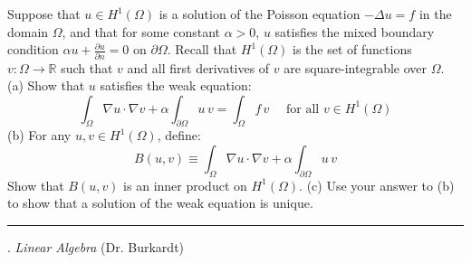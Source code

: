 \documentclass [11point]{article}
\def \rn { {\rm I} \!\! \! {\rm R}^n }
\begin{document}
Suppose that $u \in H^1(\Omega)$ is a solution of the Poisson equation $- \Delta u = f$ in the domain $\Omega$, and that for some constant $\alpha > 0$, $u$ satisfies the mixed boundary condition 
$\alpha u + \frac{\partial u}{\partial n} = 0$ on $\partial \Omega$.
\vskip 0.1in
Recall that $H^1(\Omega)$ is the set of functions $v : \Omega \rightarrow \mathbb{R}$ such that
$v$ and all first derivatives of $v$ are square-integrable over $\Omega$.
\vskip 0.1in
(a) Show that $u$ satisfies the weak equation:
\begin{displaymath}
  \int_{\Omega} \nabla u \cdot \nabla v + \alpha \int_{\partial \Omega} u \, v = \int_{\Omega} f \, v \quad {\textrm{ for all }} v\in H^1(\Omega)
\end{displaymath}
\vskip 0.1in
(b) For any $u, v \in H^1(\Omega)$, define:
\begin{displaymath}
  B(u,v) \equiv \int_{\Omega} \nabla u \cdot \nabla v + \alpha \int_{\partial \Omega} u \, v
\end{displaymath}
Show that $B(u,v)$ is an inner product on $H^1(\Omega)$.
\vskip 0.1in 
(c) Use your answer to (b) to show that a solution of the weak equation is unique.


\pagebreak
\hrule 
{}. \textit{Linear Algebra} (Dr. Burkardt)
\bigskip

\def \bfx{ {\vec x} }
\def \bfb{ {\vec b} }
\def \bfr{ {\vec r} }
\def \rn  { {\rm I}\!\!{\rm R} ^{ n} } 
\end{document}
